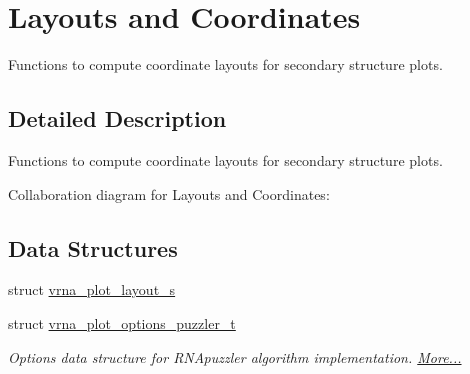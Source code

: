 \hypertarget{group__plot__layout__utils}{}\section{Layouts and Coordinates}
\label{group__plot__layout__utils}


Functions to compute coordinate layouts for secondary structure plots.  




\subsection{Detailed Description}
Functions to compute coordinate layouts for secondary structure plots. 

Collaboration diagram for Layouts and Coordinates\+:
\subsection*{Data Structures}
\begin{DoxyCompactItemize}
\item 
struct \mbox{\hyperlink{group__plot__layout__utils_structvrna__plot__layout__s}{vrna\+\_\+plot\+\_\+layout\+\_\+s}}
\item 
struct \mbox{\hyperlink{group__plot__layout__utils_structvrna__plot__options__puzzler__t}{vrna\+\_\+plot\+\_\+options\+\_\+puzzler\+\_\+t}}
\begin{DoxyCompactList}\small\item\em Options data structure for R\+N\+Apuzzler algorithm implementation.  \mbox{\hyperlink{group__plot__layout__utils_structvrna__plot__options__puzzler__t}{More...}}\end{DoxyCompactList}\end{DoxyCompactItemize}
